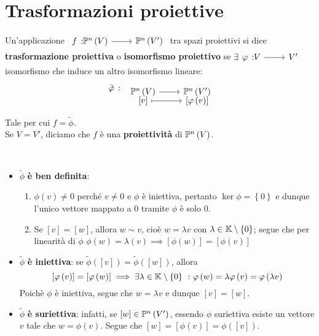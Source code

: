 \section{Trasformazioni proiettive}
\begin{define}
	Un'applicazione $\funz{f}{\proj{V}}{\proj{V'}}$ tra spazi proiettivi si dice \textbf{trasformazione proiettiva} o \textbf{isomorfismo proiettivo} se $\exists \funz{\phi}{V}{V'}$ isomorfismo che induce un altro isomorfismo lineare:
	\begin{equation}
		\begin{tikzcd}
			\tilde{\phi}\ \colon\\
		\end{tikzcd}
			\funztot{\ }{\proj{V}}{\proj{V'}}{\left[v\right]}{\left[\phi\left(v\right)\right]}
	\end{equation}
	Tale per cui $f=\tilde{\phi}$.\\
	Se $V=V'$, diciamo che $f$ è una \textbf{proiettività} di $\proj{V}$.
\end{define}
\begin{demonstration}~{}
	\begin{itemize}
		\item $\tilde{\phi}$ \textbf{è ben definita}:
		\begin{enumerate}
			\item $\phi\left(v\right)\neq 0$ perché $v\neq 0$ e $\phi$ è iniettiva, pertanto $\ker\phi=\left\{0\right\}$ e dunque l'unico vettore mappato a $0$ tramite $\phi$ è solo $0$.
			\item Se $\left[v\right]=\left[w\right]$, allora $w\sim v$, cioè $w=\lambda v$ con $\lambda\in\mathbb{K}\setminus\left\{0\right\}$; segue che per linearità di $\phi$ $\phi\left(w\right)=\lambda \left(v\right)\implies \left[\phi\left(w\right)\right]=\left[\phi\left(v\right)\right]$
		\end{enumerate}
		\item $\tilde{\phi}$ \textbf{è iniettiva}: se $\tilde{\phi}\left(\left[v\right]\right)=\tilde{\phi}\left(\left[w\right]\right)$, allora
		\begin{equation*}
			\left[\phi\left(v\right)\right]=\left[\phi\left(w\right)\right]\implies\exists\lambda\in\kamp\setminus\left\{0\right\}\ \colon\phi\left(w\right)=\lambda\phi\left(v\right)=\phi\left(\lambda v\right)
		\end{equation*}
	Poichè $\phi$ è iniettiva, segue che $w=\lambda v$ e dunque $\left[v\right]=\left[w\right]$.
		\item $\tilde{\phi}$ \textbf{è suriettiva}: infatti, se $\left[w\right]\in\proj{V'}$, essendo $\phi$ suriettiva esiste un vettore $v$ tale che $w=\phi\left(v\right)$. Segue che $\left[w\right]=\left[\phi\left(v\right)\right]=\phi\left(\left[v\right]\right)$.
	\end{itemize}
\end{demonstration}
